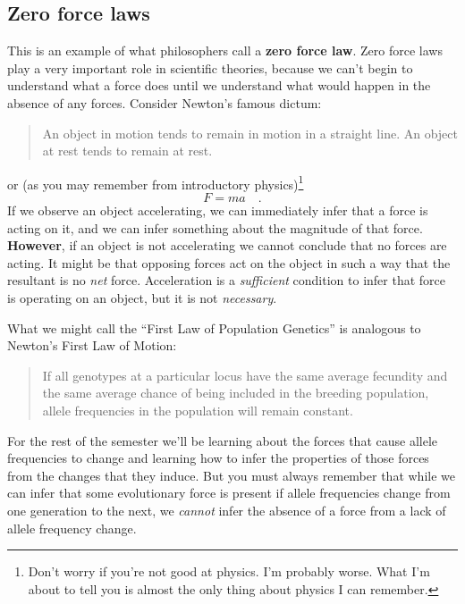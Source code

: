 \subsection*{Zero force laws}

This is an example of what philosophers call a {\bf zero force
law}. Zero force laws play a very important role in scientific
theories, because we can't begin to understand what a force does until
we understand what would happen in the absence of any forces. Consider
Newton's famous dictum: 
\begin{quotation}
\noindent An object in motion tends to remain in motion in a straight
line. An object at rest tends to remain at rest.
\end{quotation}
or (as you may remember from introductory physics)\footnote{Don't
  worry if you're not good at physics. I'm probably worse. What I'm
  about to tell you is almost the only thing about physics I can
  remember.} 
\[
F = ma \quad.
\]
\noindent If we observe an object accelerating, we can immediately
infer that a force is acting on it, and we can infer something about
the magnitude of that force.  {\bf However}, if an object is not
accelerating we cannot conclude that no forces are acting. It might be
that opposing forces act on the object in such a way that the
resultant is no {\it net\/} force. Acceleration is a {\it sufficient\/}
condition to infer that force is operating on an object, but it is not
{\it necessary}.

What we might call the ``First Law of Population Genetics'' is
analogous to Newton's First Law of Motion:
\begin{quotation}
\noindent If all genotypes at a particular locus have the same average
fecundity and the same average chance of being included in the breeding
population, allele frequencies in the population will remain constant.
\end{quotation}
For the rest of the semester we'll be learning about the forces that
cause allele frequencies to change and learning how to infer the
properties of those forces from the changes that they induce. But you
must always remember that while we can infer that some evolutionary
force is present if allele frequencies change from one generation to
the next, we {\it cannot\/} infer the absence of a force from a lack
of allele frequency change.

